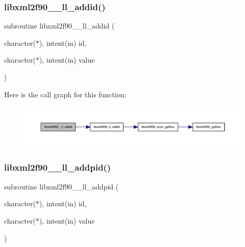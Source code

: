 \subsubsection{\texorpdfstring{libxml2f90\+\_\+\+\_\+ll\+\_\+addid()}{libxml2f90\_\_ll\_addid()}}
{\footnotesize\ttfamily subroutine libxml2f90\+\_\+\+\_\+ll\+\_\+addid (\begin{DoxyParamCaption}\item[{character($\ast$), intent(in)}]{id,  }\item[{character($\ast$), intent(in)}]{value }\end{DoxyParamCaption})}

Here is the call graph for this function\+:
\nopagebreak
\begin{figure}[H]
\begin{center}
\leavevmode
\includegraphics[width=350pt]{libxml2f90_8f90__pp_8f90_ab78ccc23aca850d7f57e4cbb417fa8a3_cgraph}
\end{center}
\end{figure}
\mbox{\label{libxml2f90_8f90__pp_8f90_a27b88f71526165bff7aec413fad71028}} 
\subsubsection{\texorpdfstring{libxml2f90\+\_\+\+\_\+ll\+\_\+addpid()}{libxml2f90\_\_ll\_addpid()}}
{\footnotesize\ttfamily subroutine libxml2f90\+\_\+\+\_\+ll\+\_\+addpid (\begin{DoxyParamCaption}\item[{character($\ast$), intent(in)}]{id,  }\item[{character($\ast$), intent(in)}]{value }\end{DoxyParamCaption})}

